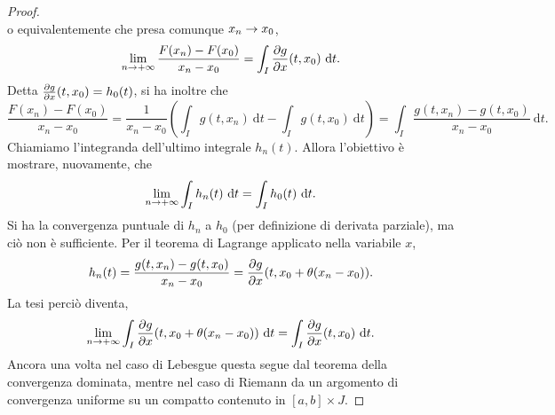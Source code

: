 \documentclass[Completo.tex]{subfiles}
\begin{document}
\begin{proof}
\begin{equation*}
		\end{equation*}
		o equivalentemente che presa comunque $x_n \rightarrow x_0$,
		\begin{equation*}
		\lim_{n \ra +\infty} \frac{F(x_n) - F(x_0)}{x_n-x_0} = \int_I \frac{\pd g}{\pd x}(t, x_0) \ \mathrm{d}t.
		\end{equation*}
		Detta $\frac{\partial g}{\partial x}(t, x_0) = h_0(t)$, si ha inoltre che
		\begin{equation*}
		\frac{F(x_n) - F(x_0)}{x_n-x_0} = \frac{1}{x_n-x_0} \left( \int_I g(t, x_n) \ \mathrm{d}t - \int_I g(t, x_0) \ \mathrm{d}t \right) = \int_I \frac{g(t, x_n) - g(t, x_0)}{x_n-x_0} \ \mathrm{d}t.
		\end{equation*}
		Chiamiamo l'integranda dell'ultimo integrale $h_n(t)$. Allora l'obiettivo è mostrare, nuovamente, che
		\begin{equation*}
		\lim_{n \rightarrow +\infty} \int_I h_n(t) \ \mathrm{d}t = \int_I h_0(t) \ \mathrm{d}t.
		\end{equation*}
		Si ha la convergenza puntuale di $h_n$ a $h_0$ (per definizione di derivata parziale), ma ciò non è sufficiente. Per il teorema di Lagrange applicato nella variabile $x$,
		\begin{equation*}
		h_n(t) = \frac{g(t, x_n) - g(t, x_0)}{x_n-x_0} = \frac{\partial g}{\partial x}(t, x_0 + \theta(x_n-x_0)).
		\end{equation*}
		La tesi perciò diventa,
		\begin{equation*}
		\lim_{n \ra +\infty} \int_I \frac{\pd g}{\pd x}(t, x_0 + \theta(x_n-x_0)) \ \mathrm{d}t = \int_I \frac{\pd g}{\pd x}(t, x_0) \ \mathrm{d}t.
		\end{equation*}
		Ancora una volta nel caso di Lebesgue questa segue dal teorema della convergenza dominata, mentre nel caso di Riemann da un argomento di convergenza uniforme su un compatto contenuto in $[a,b] \times J$.
	\end{proof}
\end{document}
